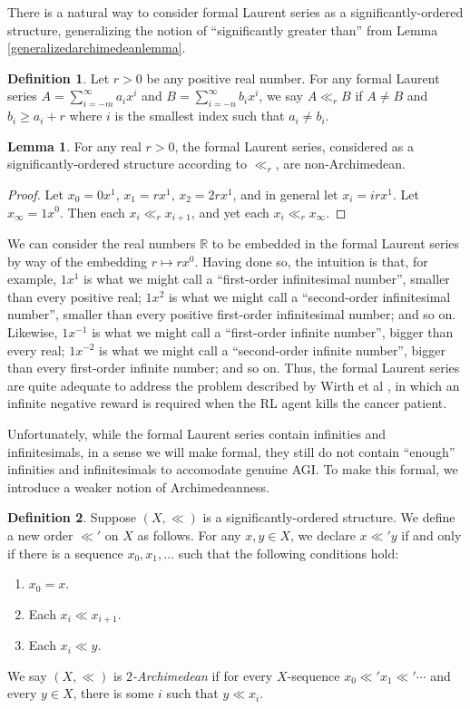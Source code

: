 \documentclass[reqno]{article}
\theoremstyle{definition}
\newtheorem{lemma}[theorem]{Lemma}
\newtheorem{definition}{Definition}
\begin{document}
There is a natural way to consider formal Laurent series as a significantly-ordered
structure, generalizing the notion of ``significantly greater than'' from
Lemma \ref{generalizedarchimedeanlemma}.

\begin{definition}
\label{significantorderednessoflaurent}
Let $r>0$ be any positive real number.
For any formal Laurent series $A=\sum_{i=-m}^\infty a_ix^i$
and $B=\sum_{i=-n}^\infty b_ix^i$,
we say $A\ll_r B$ if $A\not=B$ and $b_i\geq a_i+r$ where $i$ is the smallest
index such that $a_i\not=b_i$.
\end{definition}

\begin{lemma}
For any real $r>0$, the formal Laurent series, considered as a significantly-ordered
structure according to $\ll_r$, are non-Archimedean.
\end{lemma}

\begin{proof}
Let $x_0=0x^1$, $x_1=rx^1$, $x_2=2rx^1$, and in general let
$x_i=irx^1$. Let $x_\infty=1x^0$. Then each $x_i\ll_r x_{i+1}$,
and yet each $x_i\ll_r x_\infty$.
\end{proof}

We can consider the real numbers $\mathbb R$ to be embedded in the formal Laurent
series by way of the embedding $r\mapsto rx^0$. Having done so, the intuition is that,
for example, $1x^1$ is what we might call a ``first-order infinitesimal number'', smaller
than every positive real;
$1x^2$ is what we might call a ``second-order infinitesimal number'', smaller than every
positive first-order infinitesimal number; and so on. Likewise,
$1x^{-1}$ is what we might call a ``first-order infinite number'', bigger than
every real; $1x^{-2}$ is what we might call a ``second-order infinite number'', bigger
than every first-order infinite number; and so on. Thus, the formal Laurent series are
quite adequate to address the problem described by
Wirth et al \cite{wirth2017survey}, in which an infinite negative reward is required when the
RL agent kills the cancer patient.

Unfortunately, while the formal Laurent series contain infinities and infinitesimals,
in a sense we will make formal, they still do not contain ``enough'' infinities and
infinitesimals to accomodate genuine AGI. To make this formal, we introduce a weaker
notion of Archimedeanness.

\begin{definition}
Suppose $(X,\ll)$ is a significantly-ordered structure.
We define a new order $\ll'$ on $X$ as follows.
For any $x,y\in X$, we declare $x\ll' y$ if and only if there is a sequence
$x_0,x_1,\ldots$ such that the following conditions hold:
\begin{enumerate}
    \item
    $x_0=x$.
    \item
    Each $x_i\ll x_{i+1}$.
    \item
    Each $x_i\ll y$.
\end{enumerate}
We say $(X,\ll)$ is \emph{$2$-Archimedean} if for every $X$-sequence
$x_0\ll' x_1\ll' \cdots$ and every $y\in X$, there is some $i$ such that
$y\ll x_i$.
\end{definition}
\end{document}
